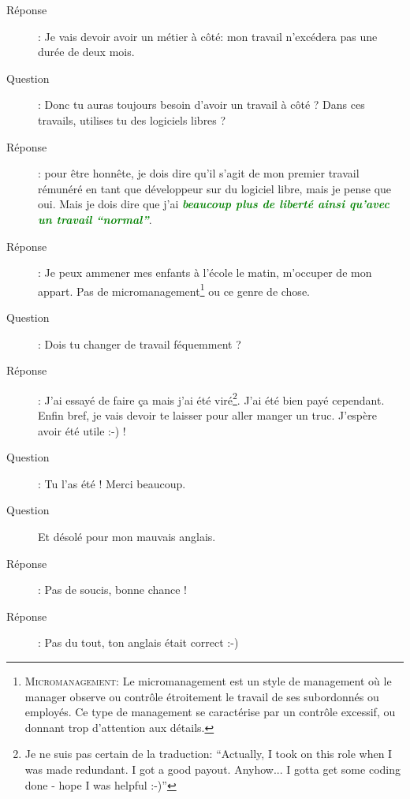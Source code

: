 \documentclass[a4paper,12pt, draft]{report}
\newcommand{\goodPoint}[1]{\textcolor{green}{\textbf{\textit{#1}}}}
\begin{document}
\begin{description}
\item [Réponse]:  Je vais devoir avoir un métier à côté: mon travail n'excédera pas une durée de deux mois. 
\item [Question]:  Donc tu auras toujours besoin d'avoir un travail à côté ? Dans ces travails, utilises tu des logiciels libres ?
\item [Réponse]:  pour être honnête, je dois dire qu'il s'agit de mon premier travail rémunéré en tant que développeur sur du logiciel libre, mais je pense que oui. Mais je dois dire que j'ai \goodPoint{beaucoup plus de liberté ainsi qu'avec un travail ``normal''}.
\item [Réponse]:  Je peux ammener mes enfants à l'école le matin, m'occuper de mon appart. Pas de micromanagement\footnote{\textsc{Micromanagement}: Le micromanagement est un style de management où le manager observe ou contrôle étroitement le travail de ses subordonnés ou employés. Ce type de management se caractérise par un contrôle excessif, ou donnant trop d'attention aux détails.} ou ce genre de chose.
\item [Question]:  Dois tu changer de travail féquemment ?
\item [Réponse]:  J'ai essayé de faire ça mais j'ai été viré\footnote{Je ne suis pas certain de la traduction: ``Actually, I took on this role when I was made redundant. I got a good payout. Anyhow... I gotta get some coding done - hope I was helpful :-)''}. J'ai été bien payé cependant. Enfin bref, je vais devoir te laisser pour aller manger un truc. J'espère avoir été utile :-) !
\item [Question]:  Tu l'as été ! Merci beaucoup.
\item [Question] Et désolé pour mon mauvais anglais.
\item [Réponse]:  Pas de soucis, bonne chance !
\item [Réponse]:  Pas du tout, ton anglais était correct :-)

\end{description}
\end{document}
